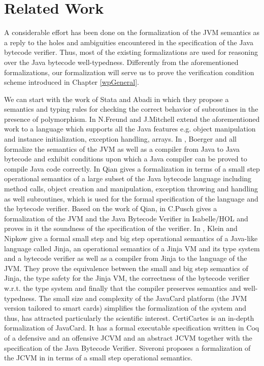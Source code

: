 \section{Related Work}\label{relWork}
 A considerable effort has been done on the formalization of 
 the JVM semantics as a reply to the holes and ambiguities encountered in
 the specification of the Java bytecode verifier. 
 Thus,  most of the existing formalizations are
 used for reasoning over the Java bytecode well-typedness.
  Differently from the aforementioned formalizations, our formalization will serve us to prove the verification condition scheme introduced 
in Chapter \ref{wpGeneral}. 

 We can start with the work of Stata and Abadi \cite{stata98type} in which they propose a semantics  and 
  typing rules for checking the correct behavior of  subroutines in the presence of polymorphism.
 In \cite{FM99FFJ}  N.Freund and J.Mitchell extend the aforementioned work to 
 a language which supports all the Java features e.g.
 object manipulation and instance initialization, exception handling, arrays.
In \cite{borger98defining}, Boerger and all formalize the semantics of the JVM as
well as a compiler from Java to Java bytecode and exhibit conditions upon which a Java compiler
can be proved to compile Java code correctly.
 In \cite{qian99formal}  Qian  gives a formalization in terms of a small step operational semantics of a
 large subset of the Java bytecode language including method calls, object creation and manipulation,
 exception throwing and handling as well subroutines, which is used for the formal specification of the language and the bytecode verifier.
 Based on the work of Qian, in \cite{pusch98proving} C.Pusch gives a formalization of the JVM and the Java Bytecode Verifier
 in Isabelle/HOL and proves in it the soundness of the specification of the verifier.
 In \cite{KleinN04}, Klein and Nipkow give a formal small step and big step operational
 semantics of a Java-like language called Jinja, an operational semantics of a Jinja VM and its type system and a bytecode verifier as well as 
 a compiler from Jinja to the language of the JVM. They prove the equivalence between the small and big step
 semantics of Jinja, the  type safety for the Jinja VM, the correctness of the bytecode verifier w.r.t. the type system
 and finally that the compiler preserves semantics and well-typedness.
  The small size and complexity of the JavaCard platform (the JVM version tailored to smart cards) 
 simplifies the formalization of the system and thus,
 has attracted  particularly the scientific interest. CertiCartes \cite{barthe01formal,barthe02formal}
 is an in-depth formalization of JavaCard. It has a formal executable
 specification written in Coq of a defensive and an offensive JCVM and an abstract JCVM together with the specification
 of the Java Bytecode Verifier.  Siveroni proposes a formalization of the JCVM in \cite{siveroni04operational} in terms of
 a small step operational semantics. 

